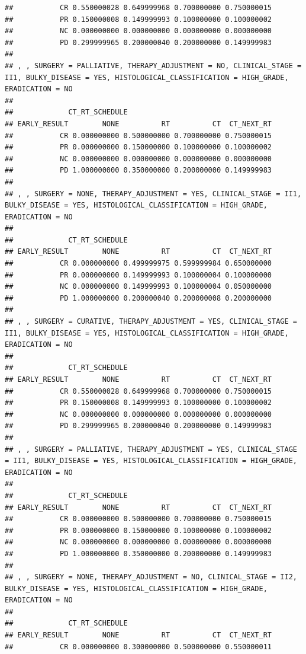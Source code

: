 \documentclass[]{article}
\begin{document}
\begin{verbatim}
##           CR 0.550000028 0.649999968 0.700000000 0.750000015
##           PR 0.150000008 0.149999993 0.100000000 0.100000002
##           NC 0.000000000 0.000000000 0.000000000 0.000000000
##           PD 0.299999965 0.200000040 0.200000000 0.149999983
## 
## , , SURGERY = PALLIATIVE, THERAPY_ADJUSTMENT = NO, CLINICAL_STAGE = II1, BULKY_DISEASE = YES, HISTOLOGICAL_CLASSIFICATION = HIGH_GRADE, ERADICATION = NO
## 
##             CT_RT_SCHEDULE
## EARLY_RESULT        NONE          RT          CT  CT_NEXT_RT
##           CR 0.000000000 0.500000000 0.700000000 0.750000015
##           PR 0.000000000 0.150000000 0.100000000 0.100000002
##           NC 0.000000000 0.000000000 0.000000000 0.000000000
##           PD 1.000000000 0.350000000 0.200000000 0.149999983
## 
## , , SURGERY = NONE, THERAPY_ADJUSTMENT = YES, CLINICAL_STAGE = II1, BULKY_DISEASE = YES, HISTOLOGICAL_CLASSIFICATION = HIGH_GRADE, ERADICATION = NO
## 
##             CT_RT_SCHEDULE
## EARLY_RESULT        NONE          RT          CT  CT_NEXT_RT
##           CR 0.000000000 0.499999975 0.599999984 0.650000000
##           PR 0.000000000 0.149999993 0.100000004 0.100000000
##           NC 0.000000000 0.149999993 0.100000004 0.050000000
##           PD 1.000000000 0.200000040 0.200000008 0.200000000
## 
## , , SURGERY = CURATIVE, THERAPY_ADJUSTMENT = YES, CLINICAL_STAGE = II1, BULKY_DISEASE = YES, HISTOLOGICAL_CLASSIFICATION = HIGH_GRADE, ERADICATION = NO
## 
##             CT_RT_SCHEDULE
## EARLY_RESULT        NONE          RT          CT  CT_NEXT_RT
##           CR 0.550000028 0.649999968 0.700000000 0.750000015
##           PR 0.150000008 0.149999993 0.100000000 0.100000002
##           NC 0.000000000 0.000000000 0.000000000 0.000000000
##           PD 0.299999965 0.200000040 0.200000000 0.149999983
## 
## , , SURGERY = PALLIATIVE, THERAPY_ADJUSTMENT = YES, CLINICAL_STAGE = II1, BULKY_DISEASE = YES, HISTOLOGICAL_CLASSIFICATION = HIGH_GRADE, ERADICATION = NO
## 
##             CT_RT_SCHEDULE
## EARLY_RESULT        NONE          RT          CT  CT_NEXT_RT
##           CR 0.000000000 0.500000000 0.700000000 0.750000015
##           PR 0.000000000 0.150000000 0.100000000 0.100000002
##           NC 0.000000000 0.000000000 0.000000000 0.000000000
##           PD 1.000000000 0.350000000 0.200000000 0.149999983
## 
## , , SURGERY = NONE, THERAPY_ADJUSTMENT = NO, CLINICAL_STAGE = II2, BULKY_DISEASE = YES, HISTOLOGICAL_CLASSIFICATION = HIGH_GRADE, ERADICATION = NO
## 
##             CT_RT_SCHEDULE
## EARLY_RESULT        NONE          RT          CT  CT_NEXT_RT
##           CR 0.000000000 0.300000000 0.500000000 0.550000011

\end{verbatim}
\end{document}
